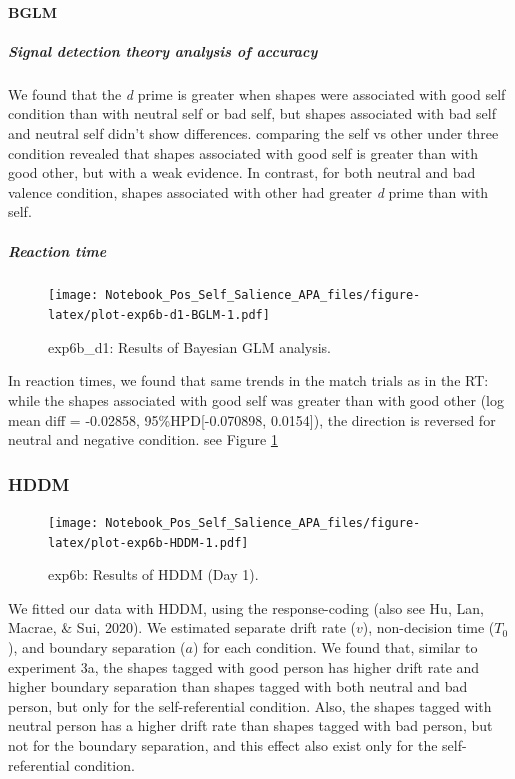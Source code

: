 \documentclass[
  english,
  man]{apa6}
\let\oldparagraph\paragraph
\renewcommand{\paragraph}[1]{\oldparagraph{#1}\mbox{}}
\let\oldsubparagraph\subparagraph
\renewcommand{\subparagraph}[1]{\oldsubparagraph{#1}\mbox{}}
\begin{document}
\hypertarget{bglm-4}{%
\paragraph{BGLM}\label{bglm-4}}

\hypertarget{signal-detection-theory-analysis-of-accuracy-6}{%
\subparagraph{Signal detection theory analysis of accuracy}\label{signal-detection-theory-analysis-of-accuracy-6}}

We found that the \emph{d} prime is greater when shapes were associated with good self condition than with neutral self or bad self, but shapes associated with bad self and neutral self didn't show differences. comparing the self vs other under three condition revealed that shapes associated with good self is greater than with good other, but with a weak evidence. In contrast, for both neutral and bad valence condition, shapes associated with other had greater \emph{d} prime than with self.

\hypertarget{reaction-time-9}{%
\subparagraph{Reaction time}\label{reaction-time-9}}

\begin{figure}
\centering
\texttt{[image: Notebook\_Pos\_Self\_Salience\_APA\_files/figure-latex/plot-exp6b-d1-BGLM-1.pdf]}
\caption{\label{fig:plot-exp6b-d1-BGLM}exp6b\_d1: Results of Bayesian GLM analysis.}
\end{figure}

In reaction times, we found that same trends in the match trials as in the RT: while the shapes associated with good self was greater than with good other (log mean diff = -0.02858, 95\%HPD{[}-0.070898, 0.0154{]}), the direction is reversed for neutral and negative condition. see Figure \ref{fig:plot-exp6b-d1-BGLM}

\hypertarget{hddm-7}{%
\subsubsection{HDDM}\label{hddm-7}}

\begin{figure}
\centering
\texttt{[image: Notebook\_Pos\_Self\_Salience\_APA\_files/figure-latex/plot-exp6b-HDDM-1.pdf]}
\caption{\label{fig:plot-exp6b-HDDM}exp6b: Results of HDDM (Day 1).}
\end{figure}

We fitted our data with HDDM, using the response-coding (also see Hu, Lan, Macrae, \& Sui, 2020). We estimated separate drift rate (\(v\)), non-decision time (\(T_{0}\)), and boundary separation (\(a\)) for each condition. We found that, similar to experiment 3a, the shapes tagged with good person has higher drift rate and higher boundary separation than shapes tagged with both neutral and bad person, but only for the self-referential condition. Also, the shapes tagged with neutral person has a higher drift rate than shapes tagged with bad person, but not for the boundary separation, and this effect also exist only for the self-referential condition.
\end{document}
